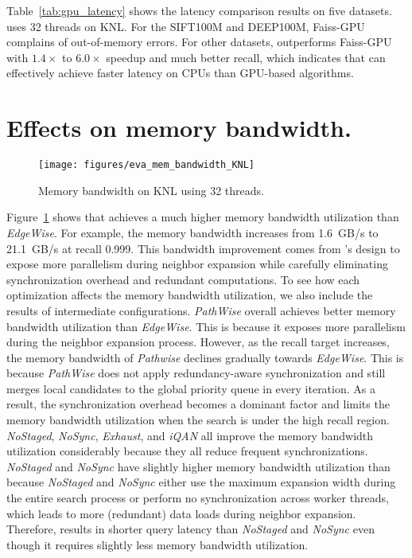 Table~\ref{tab:gpu_latency} shows the latency comparison results on five datasets. \Hammer uses 32 threads on KNL.
For the SIFT100M and DEEP100M, Faiss-GPU complains of out-of-memory errors. 
For other datasets, \Hammer outperforms Faiss-GPU with $1.4\times$ to $6.0\times$ speedup and much better recall, which indicates that \Hammer can effectively achieve faster latency on CPUs than GPU-based algorithms.



{
\section{Effects on memory bandwidth.}

\begin{figure}[h]
\centering
\texttt{[image: figures/eva\_mem\_bandwidth\_KNL]}
\caption{Memory bandwidth on KNL using 32 threads.}
\label{fig:eva_mem_bandwidth_KNL}
\end{figure}

Figure~\ref{fig:eva_mem_bandwidth_KNL} shows that {\Hammer} achieves a much higher memory bandwidth utilization than \emph{EdgeWise}. For example, the memory bandwidth increases from 1.6~GB/s to 21.1~GB/s at recall 0.999. This bandwidth improvement comes from \Hammer's design to expose more parallelism during neighbor expansion while carefully eliminating synchronization overhead and redundant computations. 
To see how each optimization affects the memory bandwidth utilization, we also include the results of intermediate configurations. \emph{PathWise} overall achieves better memory bandwidth utilization than \emph{EdgeWise}. This is because it exposes more parallelism during the neighbor expansion process. However, as the recall target increases, the memory bandwidth of \emph{Pathwise} declines gradually towards \emph{EdgeWise}. This is because \emph{PathWise} does not apply redundancy-aware synchronization and still merges local candidates to the global priority queue in every iteration. As a result, the synchronization overhead becomes a dominant factor and limits the memory bandwidth utilization when the search is under the high recall region.
\emph{NoStaged}, \emph{NoSync}, \emph{Exhaust}, and \emph{iQAN} all improve the memory bandwidth utilization considerably because they all reduce frequent synchronizations.
\emph{NoStaged} and \emph{NoSync} have slightly higher memory bandwidth utilization than \Hammer because \emph{NoStaged} and \emph{NoSync} either use the maximum expansion width during the entire search process or perform no synchronization across worker threads, which leads to more (redundant) data loads during neighbor expansion. Therefore, \Hammer results in shorter query latency than \emph{NoStaged} and \emph{NoSync} even though it requires slightly less memory bandwidth utilization.  

}
